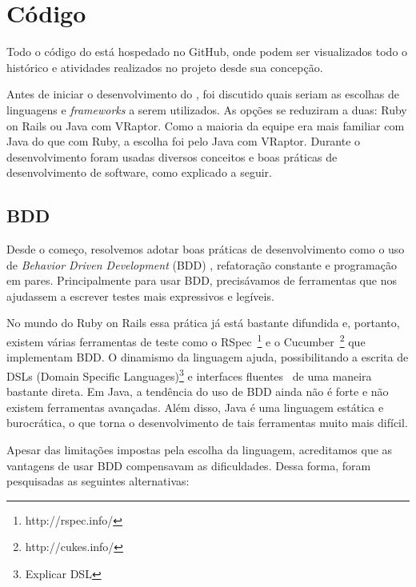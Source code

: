 \section{Código}

Todo o código do \calopsita{} está hospedado no GitHub, onde podem ser visualizados todo o histórico e atividades realizados no projeto desde sua concepção.

Antes de iniciar o desenvolvimento do \calopsita{}, foi discutido quais seriam as escolhas de linguagens e \textit{frameworks} a serem utilizados. As opções se reduziram a duas: Ruby on Rails ou Java com VRaptor. Como a maioria da equipe era mais familiar com Java do que com Ruby, a escolha foi pelo Java com VRaptor. Durante o desenvolvimento foram usadas diversos conceitos e boas práticas de desenvolvimento de software, como explicado a seguir.


\subsection{BDD} 
\label{bdd}

Desde o começo, resolvemos adotar boas práticas de desenvolvimento como o uso de \textit{Behavior Driven Development} (BDD) \cite{bdd}, refatoração constante e programação em pares. Principalmente para usar BDD, precisávamos de ferramentas que nos ajudassem a escrever testes mais expressivos e legíveis. 

No mundo do Ruby on Rails essa prática já está bastante difundida e, portanto, existem várias ferramentas de teste como o RSpec~\footnote{http://rspec.info/} e o Cucumber~\footnote{http://cukes.info/} que implementam BDD. O dinamismo da linguagem ajuda, possibilitando a escrita de DSLs (Domain Specific Languages)\footnote{Explicar DSL} e interfaces fluentes~\cite{dsl} de uma maneira bastante direta. Em Java, a tendência do uso de BDD ainda não é forte e não existem ferramentas avançadas. Além disso, Java é uma linguagem estática e burocrática, o que torna o desenvolvimento de tais ferramentas muito mais difícil. 

Apesar das limitações impostas pela escolha da linguagem, acreditamos que as vantagens de usar BDD compensavam as dificuldades. Dessa forma, foram pesquisadas as seguintes alternativas:


